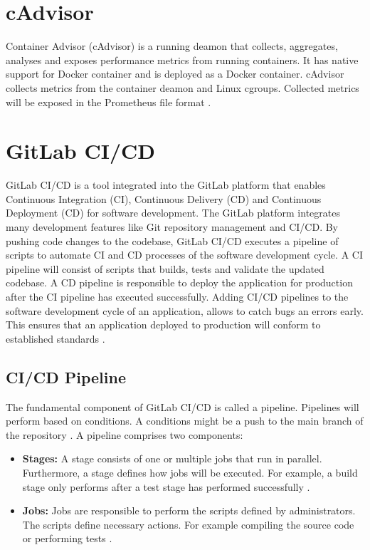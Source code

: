 \section{cAdvisor}
Container Advisor (cAdvisor) is a running deamon that collects, aggregates, analyses and exposes performance metrics from running containers.
It has native support for Docker container and is deployed as a Docker container.
cAdvisor collects metrics from the container deamon and Linux cgroups.
Collected metrics will be exposed in the Prometheus file format \cite{Bastos2019Prom, cadvisor2020Docs}.


\section{GitLab CI/CD}
\label{sec:04_background_gitlab}
GitLab CI/CD is a tool integrated into the GitLab platform that enables Continuous Integration (CI), Continuous Delivery (CD) and Continuous Deployment (CD) for software development.
The GitLab platform integrates many development features like Git repository management and CI/CD.
By pushing code changes to the codebase, GitLab CI/CD executes a pipeline of scripts to automate CI and CD processes of the software development cycle.
A CI pipeline will consist of scripts that builds, tests and validate the updated codebase.
A CD pipeline is responsible to deploy the application for production after the CI pipeline has executed successfully.
Adding CI/CD pipelines to the software development cycle of an application, allows to catch bugs an errors early. This ensures that an application deployed to production will conform to established standards \cite{Gitlab2020Docs}.

\subsection{CI/CD Pipeline}

The fundamental component of GitLab CI/CD is called a pipeline. Pipelines will perform based on conditions. A conditions might be a push to the main branch of the repository \cite{Gitlab2020Docs}. A pipeline comprises two components:

\begin{itemize}
\item \textbf{Stages:} A stage consists of one or multiple jobs that run in parallel. Furthermore, a stage defines how jobs will be executed. For example, a build stage only performs after a test stage has performed successfully \cite{Gitlab2020Docs}.

\item \textbf{Jobs:} Jobs are responsible to perform the scripts defined by administrators. The scripts define necessary actions. For example compiling the source code or performing tests \cite{Gitlab2020Docs}.
\end{itemize}


